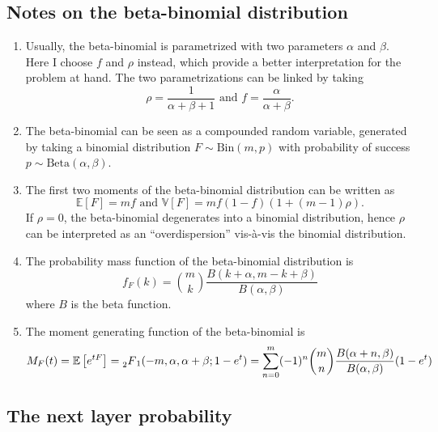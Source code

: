 \documentclass[american, abstract=on]{scrartcl}
\theoremstyle{plain}
\newcommand{\E}{\mathbb{E}}
\newcommand{\V}{\mathbb{V}}
\newcommand{\Beta}{\text{Beta}}
\newcommand{\Bin}{\text{Bin}}
\begin{document}
\subsection{Notes on the beta-binomial distribution}

\begin{enumerate}
    \item Usually, the beta-binomial is parametrized with two parameters $\alpha$ and $\beta$. Here I choose $f$ and $\rho$ instead, which provide a better interpretation for the problem at hand. The two parametrizations can be linked by taking \begin{equation}
        \rho = \frac{1}{\alpha + \beta + 1} \text{ and } f = \frac{\alpha}{\alpha + \beta}.
    \end{equation}
    \item The beta-binomial can be seen as a compounded random variable, generated by taking a binomial distribution $F \sim \Bin(m, p)$ with probability of success $p \sim \Beta(\alpha, \beta)$.
    \item The first two moments of the beta-binomial distribution can be written as \begin{equation}
        \E[F] = m f \text{ and } \V[F] = m f (1 - f) (1 + (m - 1) \rho).
    \end{equation} If $\rho = 0$, the beta-binomial degenerates into a binomial distribution, hence $\rho$ can be interpreted as an ``overdispersion'' vis-à-vis the binomial distribution.
    \item The probability mass function of the beta-binomial distribution is \begin{equation} \label{eq:pmf_betabinomial}
        f_F(k) = \binom{m}{k} \frac{B(k + \alpha, m - k + \beta)}{B(\alpha, \beta)}
    \end{equation} where $B$ is the beta function. 
    \item The moment generating function of the beta-binomial is \begin{equation} \label{eq:mgf_betabinomial}
        M_F(t) = \E\left[ e^{tF} \right] = \prescript{}{2}{F}_1(-m, \alpha, \alpha + \beta; 1 - e^{t}) = \sum^m_{n = 0} (-1)^n \binom{m}{n} \frac{B(\alpha + n, \beta)}{B(\alpha, \beta)} (1 - e^t)
    \end{equation}
\end{enumerate}

\subsection{The next layer probability}
\end{document}
